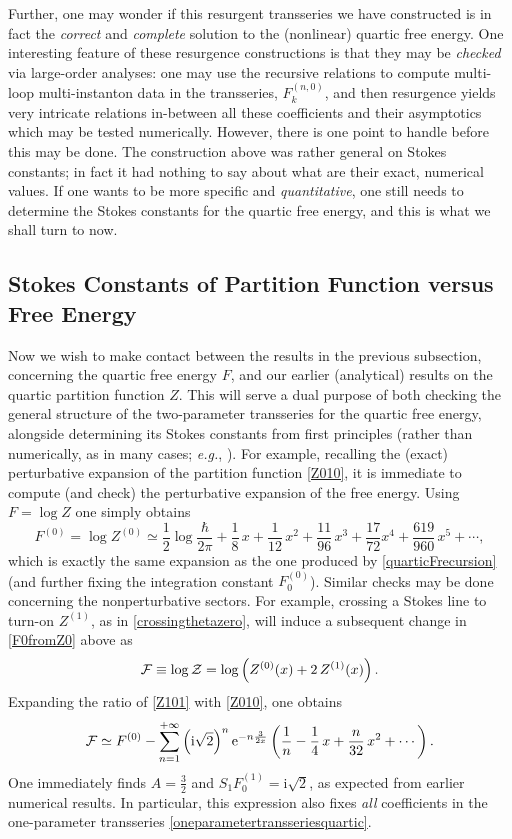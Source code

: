 \documentclass[11pt,a4paper]{article}
\newcommand{\CF}{{\cal F}}
\newcommand{\CZ}{{\cal Z}}
\newcommand{\be}{\begin{equation}}
\newcommand{\ee}{\end{equation}}
\newcommand{\rme}{{\mathrm{e}}}
\newcommand{\rmi}{{\mathrm{i}}}
\begin{document}
Further, one may wonder if this resurgent transseries we have constructed is in fact the \textit{correct} and \textit{complete} solution to the (nonlinear) quartic free energy. One interesting feature of these resurgence constructions is that they may be \textit{checked} via large-order analyses: one may use the recursive relations to compute multi-loop multi-instanton data in the transseries, $F_k^{(n,0)}$, and then resurgence yields very intricate relations in-between all these coefficients and their asymptotics which may be tested numerically. However, there is one point to handle before this may be done. The construction above was rather general on Stokes constants; in fact it had nothing to say about what are their exact, numerical values. If one wants to be more specific and \textit{quantitative}, one still needs to determine the Stokes constants for the quartic free energy, and this is what we shall turn to now.

\subsection{Stokes Constants of Partition Function versus Free Energy}\label{subsec:stokesZvsF}

Now we wish to make contact between the results in the previous subsection, concerning the quartic free energy $F$, and our earlier (analytical) results on the quartic partition function $Z$. This will serve a dual purpose of both checking the general structure of the two-parameter transseries for the quartic free energy, alongside determining its Stokes constants from first principles (rather than numerically, as in many cases; \textit{e.g.}, \cite{gikm10, asv11, sv13}). For example, recalling the (exact) perturbative expansion of the partition function \eqref{Z010}, it is immediate to compute (and check) the perturbative expansion of the free energy. Using $F = \log Z$ one simply obtains
%
\be
\label{F0fromZ0}
F^{(0)} = \log Z^{(0)} \simeq \frac{1}{2} \log \frac{\hbar}{2\pi} + \frac{1}{8}\, x + \frac{1}{12}\, x^2 + \frac{11}{96}\, x^3 + \frac{17}{72} x^4 + \frac{619}{960}\, x^5 + \cdots,
\ee
%
\noindent
which is exactly the same expansion as the one produced by \eqref{quarticFrecursion} (and further fixing the integration constant $F_0^{(0)}$). Similar checks may be done concerning the nonperturbative sectors. For example, crossing a Stokes line to turn-on $Z^{(1)}$, as in \eqref{crossingthetazero}, will induce a subsequent change in \eqref{F0fromZ0} above as
%
\be
\CF \equiv \log \CZ = \log \left( Z^{(0)}(x) + 2\, Z^{(1)}(x) \right).
\ee
%
\noindent
Expanding the ratio of \eqref{Z101} with \eqref{Z010}, one obtains
%
\be
\CF \simeq F^{(0)} - \sum_{n=1}^{+\infty} \left( \rmi \sqrt{2} \right)^n \rme^{- n \frac{3}{2x}} \left( \frac{1}{n} - \frac{1}{4}\, x + \frac{n}{32}\, x^2 + \cdots \right).
\ee
%
\noindent
One immediately finds $A = \frac{3}{2}$ and $S_1 F^{(1)}_0 = \rmi \sqrt{2}$, as expected from earlier numerical results. In particular, this expression also fixes \textit{all} coefficients in the one-parameter transseries \eqref{oneparametertransseriesquartic}.
\end{document}
